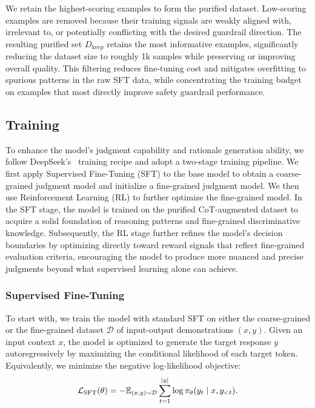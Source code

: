 \documentclass{llmxive}
\begin{document}
We retain the highest-scoring examples to form the purified dataset. Low-scoring examples are removed because their training signals are weakly aligned with, irrelevant to, or potentially conflicting with the desired guardrail direction. The resulting purified set \(D_{\mathrm{keep}}\) retains the most informative examples, significantly reducing the dataset size to roughly 1k samples while preserving or improving overall quality. This filtering reduces fine-tuning cost and mitigates overfitting to spurious patterns in the raw SFT data, while concentrating the training budget on examples that most directly improve safety guardrail performance.



\subsection{Training}
\label{subsec:train}

To enhance the model's judgment capability and rationale generation ability, we follow DeepSeek's~\citep{guo2025deepseek} training recipe and adopt a two-stage training pipeline. We first apply Supervised Fine-Tuning (SFT) to the base model to obtain a coarse-grained judgment model and initialize a fine-grained judgment model. We then use Reinforcement Learning (RL) to further optimize the fine-grained model. In the SFT stage, the model is trained on the purified CoT-augmented dataset to acquire a solid foundation of
reasoning patterns and fine-grained discriminative knowledge. Subsequently,
the RL stage further refines the model's decision boundaries by optimizing
directly toward reward signals that reflect fine-grained evaluation
criteria, encouraging the model to produce more nuanced and precise
judgments beyond what supervised learning alone can achieve.


\subsubsection{Supervised Fine-Tuning}
To start with, we train the model with standard SFT on either the coarse-grained or the fine-grained dataset $\mathcal{D}$ of input-output demonstrations $(x,y)$. Given an input context $x$, the model is optimized to generate the target response
$y$ autoregressively by maximizing the conditional likelihood of each
target token. Equivalently, we minimize the negative log-likelihood
objective:
\begin{equation}
\small
\mathcal{L}_{\mathrm{SFT}}(\theta)
=
-\mathbb{E}_{(x,y)\sim \mathcal{D}}
\sum_{t=1}^{|y|}
\log \pi_\theta(y_t \mid x, y_{<t}).
\label{eq:sft-objective}
\end{equation}
\end{document}
